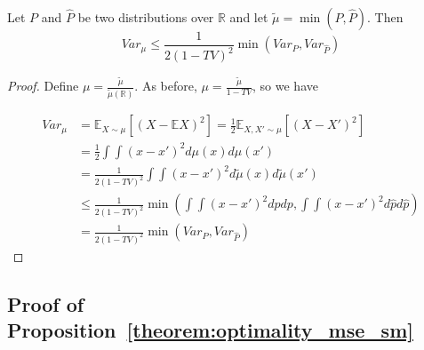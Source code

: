     \begin{lemma}
    \label{lem:variance_of_mu}Let $P$ and $\hat{P}$ be two distributions
    over $\mathbb{R}$ and let $\tilde{\mu}=\min\left(P,\hat{P}\right)$.
    Then 
    \[
    Var_{\mu}\le\frac{1}{2(1-TV)^{2}}\min\left(Var_{P},Var_{\hat{P}}\right)
    \]
    \end{lemma}
    
    
    \begin{proof}
    Define $\mu=\frac{\tilde{\mu}}{\tilde{\mu}(\mathbb{R})}$. As before,
    $\mu=\frac{\tilde{\mu}}{1-TV}$, so we have
    
    \begin{align*}
    Var_{\mu} & =\mathbb{E}_{X\sim\mu}\left[(X-\mathbb{E}X)^{2}\right]=\frac{1}{2}\mathbb{E}_{X,X'\sim\mu}\left[(X-X')^{2}\right]\\
     & =\frac{1}{2}\int\int(x-x')^{2}d\mu(x)d\mu(x')\\
     & =\frac{1}{2(1-TV)^{2}}\int\int(x-x')^{2}d\tilde{\mu}(x)d\tilde{\mu}(x')\\
     & \le\frac{1}{2(1-TV)^{2}}\min\left(\int\int(x-x')^{2}dpdp,\int\int(x-x')^{2}d\hat{p}d\hat{p}\right)\\
     & =\frac{1}{2(1-TV)^{2}}\min\left(Var_{P},Var_{\hat{P}}\right)
    \end{align*}
    \end{proof}
    

    \subsection{Proof of Proposition~\ref{theorem:optimality_mse_sm}}\label{sec:app:proofmseloss}

